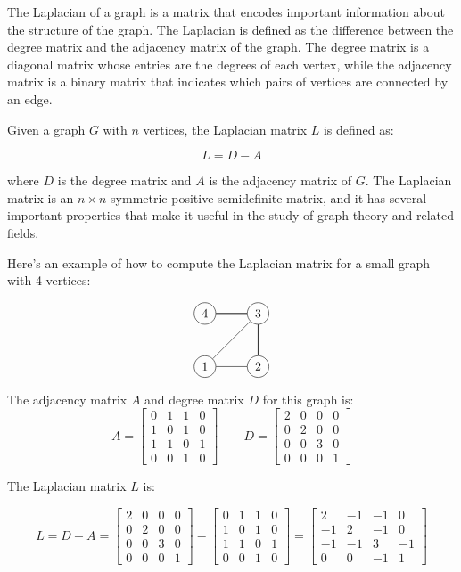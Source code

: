 The Laplacian of a graph is a matrix that encodes important information about the structure of the graph. The Laplacian is defined as the difference between the degree matrix and the adjacency matrix of the graph. The degree matrix is a diagonal matrix whose entries are the degrees of each vertex, while the adjacency matrix is a binary matrix that indicates which pairs of vertices are connected by an edge.

Given a graph $G$ with $n$ vertices, the Laplacian matrix $L$ is defined as:

$$L = D - A$$

where $D$ is the degree matrix and $A$ is the adjacency matrix of $G$. The Laplacian matrix is an $n \times n$ symmetric positive semidefinite matrix, and it has several important properties that make it useful in the study of graph theory and related fields.

Here's an example of how to compute the Laplacian matrix for a small graph with 4 vertices:

\[\begin{tikzpicture}[scale=1.5]
  \node[circle,draw] (1) at (0,0) {1};
  \node[circle,draw] (2) at (1,0) {2};
  \node[circle,draw] (3) at (1,1) {3};
  \node[circle,draw] (4) at (0,1) {4};
  \draw (1) -- (2) -- (3) -- (4);
  \draw (1) -- (3);
  \draw (2) -- (3);
  \draw (3) -- (4);
\end{tikzpicture} \]

The adjacency matrix $A$ and degree matrix $D$ for this graph is:
$$A = \begin{bmatrix}0 & 1 & 1 & 0 \\ 1 & 0 & 1 & 0 \\ 1 & 1 & 0 & 1 \\ 0 & 0 & 1 & 0\end{bmatrix} \qquad 
D = \begin{bmatrix}2 & 0 & 0 & 0 \\ 0 & 2 & 0 & 0 \\ 0 & 0 & 3 & 0 \\ 0 & 0 & 0 & 1\end{bmatrix}$$

The Laplacian matrix $L$ is:

$$L = D - A = \begin{bmatrix}2 & 0 & 0 & 0 \\ 0 & 2 & 0 & 0 \\ 0 & 0 & 3 & 0 \\ 0 & 0 & 0 & 1\end{bmatrix} - \begin{bmatrix}0 & 1 & 1 & 0 \\ 1 & 0 & 1 & 0 \\ 1 & 1 & 0 & 1 \\ 0 & 0 & 1 & 0\end{bmatrix} = \begin{bmatrix}2 & -1 & -1 & 0 \\ -1 & 2 & -1 & 0 \\ -1 & -1 & 3 & -1 \\ 0 & 0 & -1 & 1\end{bmatrix}$$

